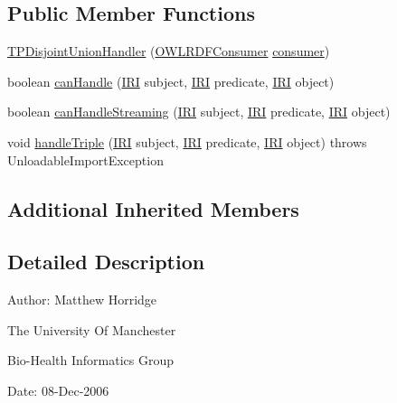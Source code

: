 \subsection*{Public Member Functions}
\begin{DoxyCompactItemize}
\item 
\hyperlink{classorg_1_1coode_1_1owlapi_1_1rdfxml_1_1parser_1_1_t_p_disjoint_union_handler_aa8d0f50e9e1ee5de8b545cee4d9f27cf}{T\-P\-Disjoint\-Union\-Handler} (\hyperlink{classorg_1_1coode_1_1owlapi_1_1rdfxml_1_1parser_1_1_o_w_l_r_d_f_consumer}{O\-W\-L\-R\-D\-F\-Consumer} \hyperlink{classorg_1_1coode_1_1owlapi_1_1rdfxml_1_1parser_1_1_abstract_triple_handler_a4ccf4d898ff01eb1cadfa04b23d54e9c}{consumer})
\item 
boolean \hyperlink{classorg_1_1coode_1_1owlapi_1_1rdfxml_1_1parser_1_1_t_p_disjoint_union_handler_ae080012530fd15c4e934883ac5a7e43c}{can\-Handle} (\hyperlink{classorg_1_1semanticweb_1_1owlapi_1_1model_1_1_i_r_i}{I\-R\-I} subject, \hyperlink{classorg_1_1semanticweb_1_1owlapi_1_1model_1_1_i_r_i}{I\-R\-I} predicate, \hyperlink{classorg_1_1semanticweb_1_1owlapi_1_1model_1_1_i_r_i}{I\-R\-I} object)
\item 
boolean \hyperlink{classorg_1_1coode_1_1owlapi_1_1rdfxml_1_1parser_1_1_t_p_disjoint_union_handler_acb9434eab64155d4210061d168288aea}{can\-Handle\-Streaming} (\hyperlink{classorg_1_1semanticweb_1_1owlapi_1_1model_1_1_i_r_i}{I\-R\-I} subject, \hyperlink{classorg_1_1semanticweb_1_1owlapi_1_1model_1_1_i_r_i}{I\-R\-I} predicate, \hyperlink{classorg_1_1semanticweb_1_1owlapi_1_1model_1_1_i_r_i}{I\-R\-I} object)
\item 
void \hyperlink{classorg_1_1coode_1_1owlapi_1_1rdfxml_1_1parser_1_1_t_p_disjoint_union_handler_a80b2d63d77425eadb5f2dd43adca7b72}{handle\-Triple} (\hyperlink{classorg_1_1semanticweb_1_1owlapi_1_1model_1_1_i_r_i}{I\-R\-I} subject, \hyperlink{classorg_1_1semanticweb_1_1owlapi_1_1model_1_1_i_r_i}{I\-R\-I} predicate, \hyperlink{classorg_1_1semanticweb_1_1owlapi_1_1model_1_1_i_r_i}{I\-R\-I} object)  throws Unloadable\-Import\-Exception 
\end{DoxyCompactItemize}
\subsection*{Additional Inherited Members}


\subsection{Detailed Description}
Author\-: Matthew Horridge\par
 The University Of Manchester\par
 Bio-\/\-Health Informatics Group\par
 Date\-: 08-\/\-Dec-\/2006\par
\par
 

